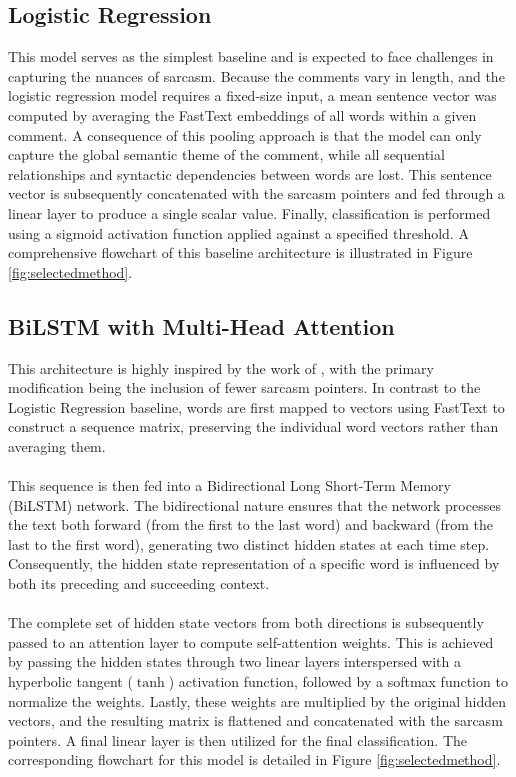 \documentclass[
 reprint,
 amsmath,amssymb,
 aps,
]{revtex4-2}
\begin{document}
\subsection{Logistic Regression}
\noindent
This model serves as the simplest baseline and is expected to face challenges in capturing the nuances of sarcasm. Because the comments vary in length, and the logistic regression model requires a fixed-size input, a mean sentence vector was computed by averaging the FastText embeddings of all words within a given comment. A consequence of this pooling approach is that the model can only capture the global semantic theme of the comment, while all sequential relationships and syntactic dependencies between words are lost. This sentence vector is subsequently concatenated with the sarcasm pointers and fed through a linear layer to produce a single scalar value. Finally, classification is performed using a sigmoid activation function applied against a specified threshold. A comprehensive flowchart of this baseline architecture is illustrated in Figure \ref{fig:selectedmethod}.

\subsection{BiLSTM with Multi-Head Attention}
\noindent
This architecture is highly inspired by the work of \cite{KumarEtAl2021}, with the primary modification being the inclusion of fewer sarcasm pointers. In contrast to the Logistic Regression baseline, words are first mapped to vectors using FastText to construct a sequence matrix, preserving the individual word vectors rather than averaging them.
\\ \\
This sequence is then fed into a Bidirectional Long Short-Term Memory (BiLSTM) network. The bidirectional nature ensures that the network processes the text both forward (from the first to the last word) and backward (from the last to the first word), generating two distinct hidden states at each time step. Consequently, the hidden state representation of a specific word is influenced by both its preceding and succeeding context.
\\ \\

The complete set of hidden state vectors from both directions is subsequently passed to an attention layer to compute self-attention weights. This is achieved by passing the hidden states through two linear layers interspersed with a hyperbolic tangent ($\tanh$) activation function, followed by a softmax function to normalize the weights. Lastly, these weights are multiplied by the original hidden vectors, and the resulting matrix is flattened and concatenated with the sarcasm pointers. A final linear layer is then utilized for the final classification. The corresponding flowchart for this model is detailed in Figure \ref{fig:selectedmethod}.
\end{document}
